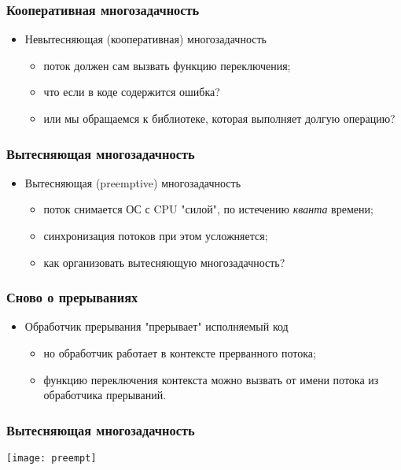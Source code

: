 \begin{frame}
\frametitle{Кооперативная многозадачность}
\begin{itemize}
   \item<1->Невытесняющая (кооперативная) многозадачность
   \begin{itemize}
      \item<1->поток должен сам вызвать функцию переключения;
      \item<2->что если в коде содержится ошибка?
      \item<3->или мы обращаемся к библиотеке, которая выполняет долгую операцию?
   \end{itemize}
\end{itemize}
\end{frame}

\begin{frame}
\frametitle{Вытесняющая многозадачность}
\begin{itemize}
    \item<1->Вытесняющая (preemptive) многозадачность
    \begin{itemize}
        \item<1->поток снимается ОС с CPU "силой", по истечению \emph{кванта}
             времени;
        \item<2->синхронизация потоков при этом усложняется;
        \item<3->как организовать вытесняющую многозадачность?
    \end{itemize}
\end{itemize}
\end{frame}

\begin{frame}
\frametitle{Сново о прерываниях}
\begin{itemize}
    \item<1->Обработчик прерывания "прерывает" исполняемый код
    \begin{itemize}
        \item<2->но обработчик работает в контексте прерванного потока;
        \item<3->функцию переключения контекста можно вызвать от имени потока
             из обработчика прерываний.
    \end{itemize}
\end{itemize}
\end{frame}

\begin{frame}
\frametitle{Вытесняющая многозадачность}
\texttt{[image: preempt]}
\end{frame}

